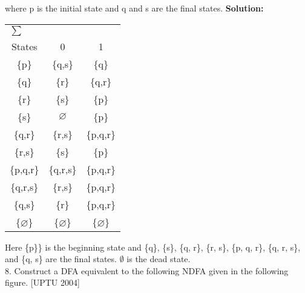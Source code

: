\documentclass [10pt,a4paper,tikz] {book}
\let\oldemptyset\emptyset
\let\emptyset\varnothing
\begin{document}
where p is the initial state and q and s are the final states.
\textbf{Solution:
}
\begin{center}

\begin{tabular}{ccc}


\toprule
\multicolumn{3}{l}{$\sum$} \\
\cmidrule(r){1-1}
 States & 0 & 1 \\
    \midrule
    \{p\} & \{q,s\} & \{q\} \\
    \{q\} & \{r\} & \{q,r\} \\
    \{r\} & \{s\} & \{p\} \\
    \{s\} & $\emptyset$ & \{p\} \\
    \{q,r\} & \{r,s\} & \{p,q,r\} \\
    \{r,s\} & \{s\} & \{p\} \\
    \{p,q,r\} & \{q,r,s\} & \{p,q,r\} \\
    \{q,r,s\} & \{r,s\} & \{p,q,r\} \\
    \{q,s\} & \{r\} & \{p,q,r\} \\
    \{$\emptyset$\}& \{$\emptyset$\} & \{$\emptyset$\} \\

    \bottomrule


\end{tabular}

\end{center}
Here \{p\}\} is the beginning state and \{q\}, \{s\}, \{q, r\}, \{r, s\}, \{p, q, r\}, \{q, r, s\}, and \{q, s\} are
the final states. $\oldemptyset$ is the dead state.\\
8. Construct a DFA equivalent to the following NDFA given in the following figure.
[UPTU 2004]



\begin{center}


\end{center}
\end{document}
